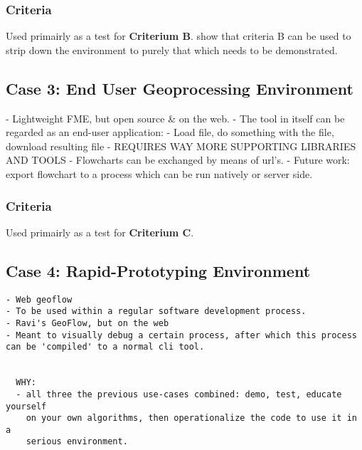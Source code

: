 

\subsubsection*{Criteria}
Used primairly as a test for \textbf{Criterium B}.
show that criteria B can be used to strip down the environment to purely that which needs to be demonstrated.

\subsection*{Case 3: End User Geoprocessing Environment}
- Lightweight FME, but open source \& on the web.
- The tool in itself can be regarded as an end-user application:
  - Load file, do something with the file, download resulting file
  - REQUIRES WAY MORE SUPPORTING LIBRARIES AND TOOLS
- Flowcharts can be exchanged by means of url's.
- Future work: export flowchart to a process which can be run natively or server side.
  

\subsubsection*{Criteria}
Used primairly as a test for \textbf{Criterium C}.


\subsection*{Case 4: Rapid-Prototyping Environment}
\begin{lstlisting}
- Web geoflow
- To be used within a regular software development process.
- Ravi's GeoFlow, but on the web
- Meant to visually debug a certain process, after which this process can be 'compiled' to a normal cli tool.


  WHY: 
  - all three the previous use-cases combined: demo, test, educate yourself
    on your own algorithms, then operationalize the code to use it in a 
    serious environment.  

  
\end{lstlisting}





